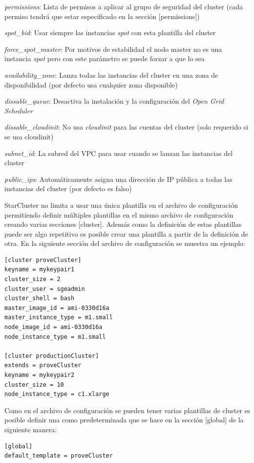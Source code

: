 \documentclass{article}
\begin{document}
{\begin{itemize}
{	\item \emph{permissions}: Lista de permisos a aplicar al grupo de seguridad del cluster (cada permiso tendrá que estar especificado en la sección [permissions])
	\item \emph{spot\_bid}: Usar siempre las instancias \textit{spot}\cite{SpotInstancesEC2} con esta plantilla del cluster
	\item \emph{force\_spot\_master}: Por motivos de estabilidad el nodo master no es una instancia \textit{spot} pero con este parámetro se puede forzar a que lo sea
	\item \emph{availability\_zone}: Lanza todas las instancias del cluster en una zona de disponibilidad (por defecto usa cualquier zona disponible)
	\item \emph{dissable\_queue}: Desactiva la instalación y la configuración del \textit{Open Grid Scheduler}\cite{OpenGridScheduler}
	\item \emph{dissable\_cloudinit}: No usa \emph{cloudinit}\cite{CloudInit} para las cuentas del cluster (solo requerido si se usa cloudinit)
	\item \emph{subnet\_id}: La subred del VPC para usar cuando se lanzan las instancias del cluster
	\item \emph{public\_ips}: Automáticamente asigna una dirección de IP pública a todas las instancias del cluster (por defecto es falso)
}\end{itemize} }

	StarCluster no limita a usar una única plantilla en el archivo de configuración permitiendo definir múltiples plantillas en el mismo archivo de configuración creando varias secciones [cluster]. Además como la definición de estas plantillas puede ser algo repetitivo es posible crear una plantilla a partir de la definición de otra. En la siguiente sección del archivo de configuración se muestra un ejemplo:
\begin{lstlisting}
[cluster proveCluster]
keyname = mykeypair1
cluster_size = 2
cluster_user = sgeadmin
cluster_shell = bash
master_image_id = ami-0330d16a
master_instance_type = m1.small
node_image_id = ami-0330d16a
node_instance_type = m1.small

[cluster productionCluster]
extends = proveCluster
keyname = mykeypair2
cluster_size = 10
node_instance_type = c1.xlarge
\end{lstlisting}
	Como en el archivo de configuración se pueden tener varias plantillas de cluster es posible definir una como predeterminada que se hace en la sección [global] de la siguiente manera:
\begin{lstlisting}
[global]
default_template = proveCluster
\end{lstlisting}
\end{document}
